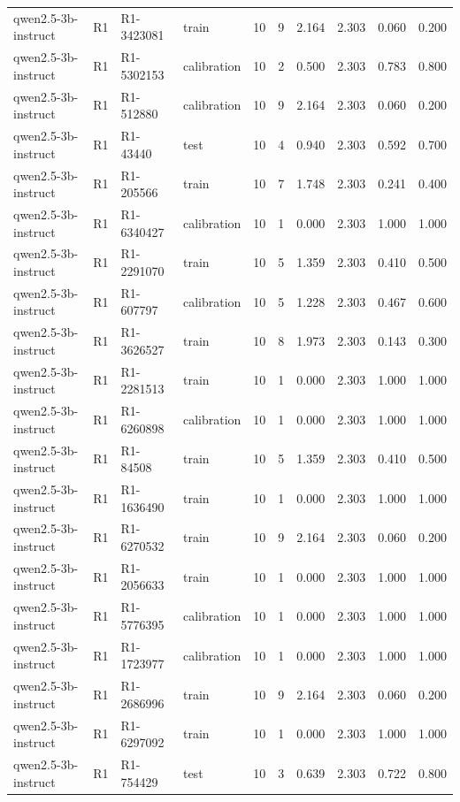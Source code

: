 \begin{table}
\begin{tabular}{llllrrrrrr}
qwen2.5-3b-instruct & R1 & R1-3423081 & train & 10 & 9 & 2.164 & 2.303 & 0.060 & 0.200 \\
qwen2.5-3b-instruct & R1 & R1-5302153 & calibration & 10 & 2 & 0.500 & 2.303 & 0.783 & 0.800 \\
qwen2.5-3b-instruct & R1 & R1-512880 & calibration & 10 & 9 & 2.164 & 2.303 & 0.060 & 0.200 \\
qwen2.5-3b-instruct & R1 & R1-43440 & test & 10 & 4 & 0.940 & 2.303 & 0.592 & 0.700 \\
qwen2.5-3b-instruct & R1 & R1-205566 & train & 10 & 7 & 1.748 & 2.303 & 0.241 & 0.400 \\
qwen2.5-3b-instruct & R1 & R1-6340427 & calibration & 10 & 1 & 0.000 & 2.303 & 1.000 & 1.000 \\
qwen2.5-3b-instruct & R1 & R1-2291070 & train & 10 & 5 & 1.359 & 2.303 & 0.410 & 0.500 \\
qwen2.5-3b-instruct & R1 & R1-607797 & calibration & 10 & 5 & 1.228 & 2.303 & 0.467 & 0.600 \\
qwen2.5-3b-instruct & R1 & R1-3626527 & train & 10 & 8 & 1.973 & 2.303 & 0.143 & 0.300 \\
qwen2.5-3b-instruct & R1 & R1-2281513 & train & 10 & 1 & 0.000 & 2.303 & 1.000 & 1.000 \\
qwen2.5-3b-instruct & R1 & R1-6260898 & calibration & 10 & 1 & 0.000 & 2.303 & 1.000 & 1.000 \\
qwen2.5-3b-instruct & R1 & R1-84508 & train & 10 & 5 & 1.359 & 2.303 & 0.410 & 0.500 \\
qwen2.5-3b-instruct & R1 & R1-1636490 & train & 10 & 1 & 0.000 & 2.303 & 1.000 & 1.000 \\
qwen2.5-3b-instruct & R1 & R1-6270532 & train & 10 & 9 & 2.164 & 2.303 & 0.060 & 0.200 \\
qwen2.5-3b-instruct & R1 & R1-2056633 & train & 10 & 1 & 0.000 & 2.303 & 1.000 & 1.000 \\
qwen2.5-3b-instruct & R1 & R1-5776395 & calibration & 10 & 1 & 0.000 & 2.303 & 1.000 & 1.000 \\
qwen2.5-3b-instruct & R1 & R1-1723977 & calibration & 10 & 1 & 0.000 & 2.303 & 1.000 & 1.000 \\
qwen2.5-3b-instruct & R1 & R1-2686996 & train & 10 & 9 & 2.164 & 2.303 & 0.060 & 0.200 \\
qwen2.5-3b-instruct & R1 & R1-6297092 & train & 10 & 1 & 0.000 & 2.303 & 1.000 & 1.000 \\
qwen2.5-3b-instruct & R1 & R1-754429 & test & 10 & 3 & 0.639 & 2.303 & 0.722 & 0.800 \\

\end{tabular}
\end{table}

